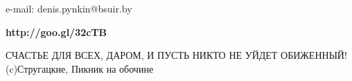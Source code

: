 
\begin{frame}
\titlepage
\begin{center}
e-mail: denis.pynkin@bsuir.by\\
\end{center}
\begin{center}
{\bfseries http://goo.gl/32cTB}

{\tiny СЧАСТЬЕ ДЛЯ ВСЕХ, ДАРОМ, И ПУСТЬ НИКТО НЕ УЙДЕТ ОБИЖЕННЫЙ!\\
(c)Стругацкие, Пикник на обочине}
\end{center}
\end{frame}
